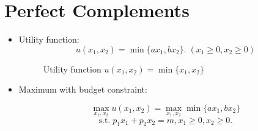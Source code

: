 \documentclass[
12pt, %
a4paper, %
onecolumn, %
portrait %
]{article}
\begin{document}
\section{Perfect Complements}


\begin{itemize}
	\item Utility function:
	\[
	u(x_1,x_2)=\min\{ax_1,bx_2\}.\;(x_1\ge0,x_2\ge 0)
	\]
	\begin{figure}[H]
		\centering
		\caption{Utility function $u(x_1,x_2)=\min\{x_1,x_2\}$}
		\label{Fig.lable}
	\end{figure}	
	
	
	\item Maximum with budget constraint:
	
	\[
	\max_{x_1,x_2} u(x_1,x_2)=\max_{x_1,x_2}\min\{ax_1,bx_2\}
	\]
	\[
	\text{s.t.}\;p_1x_1+p_2x_2=m,x_1\ge0,x_2\ge 0.
	\]


\end{itemize}
\end{document}
